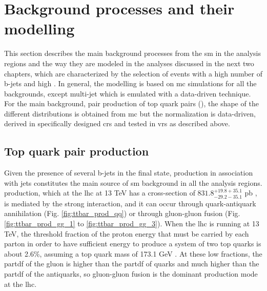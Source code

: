 \section{Background processes and their modelling}
\label{sec:common_backgrounds}

This section describes the main background processes from the \gls{sm} in the analysis regions and the way they are 
modeled in the analyses discussed in the next two chapters, which are characterized by the selection of events with a high number of b-jets 
and high \met. 
In general, the modelling is based on \gls{mc} simulations for
all the backgrounds, except multi-jet which is emulated with a data-driven technique.
For the main background, pair production of top quark pairs (\ttbar), the shape of the different distributions is obtained from \gls{mc}
but the normalization is data-driven, derived in specifically designed \glspl{cr} and tested in \glspl{vr} as described above.


\subsection{Top quark pair production}
\label{sec:susy_general:ttbar}

Given the presence of several b-jets in the final state, \ttbar production in association with jets constitutes the main source of \gls{sm} background in all the analysis regions. \ttbar production, which at the \gls{lhc} at 13 TeV has a cross-section of $831.8^{+19.8 + 35.1}_{-29.2-35.1}$ pb \cite{Czakon:2013goa}, is mediated by the strong interaction, and it can occur through quark-antiquark annihilation (Fig. \ref{fig:ttbar_prod_qq}) or through gluon-gluon fusion (Fig. \ref{fig:ttbar_prod_gg_1} to \ref{fig:ttbar_prod_gg_3}). When the \gls{lhc} is running at 13 TeV, the threshold fraction of the proton energy that must be carried by each parton in order to have sufficient energy to produce a system of two top quarks 
is about 2.6\%, assuming a top quark mass of 173.1 GeV \cite{Patrignani:2016xqp}. 
At these low fractions, the \gls{partdf} of the gluon is higher than the \gls{partdf} of quarks and much higher than the \gls{partdf} of the antiquarks, so gluon-gluon fusion is the dominant \ttbar production mode at the \gls{lhc}.


